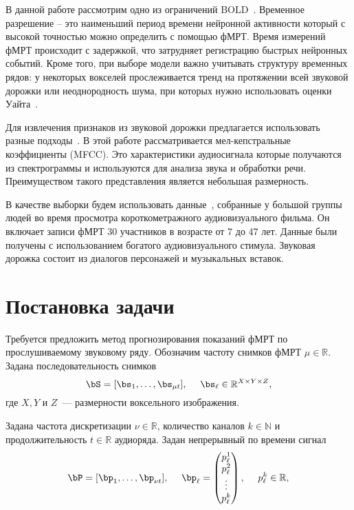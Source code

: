 \documentclass[12pt, twoside]{article}
\begin{document}
В данной работе рассмотрим одно из ограничений BOLD~\citep{menon1999spatial}. Временное разрешение -- это наименьший период времени нейронной активности который с высокой точностью можно определить с помощью фМРТ. Время измерений фМРТ происходит с задержкой, что затрудняет регистрацию быстрых нейронных событий. Кроме того, при выборе модели важно учитывать структуру временных рядов: у некоторых вокселей прослеживается тренд на протяжении всей звуковой дорожки или неоднородность шума, при которых нужно использовать оценки Уайта~\citep{hetero}.

Для извлечения признаков из звуковой дорожки предлагается использовать разные подходы~\citep{audiofeaturetrends}. В этой работе рассматривается мел-кепстральные коэффициенты (MFCC). Это характеристики аудиосигнала которые получаются из спектрограммы и используются для анализа звука и обработки речи. Преимуществом такого представления является небольшая размерность.

В качестве выборки будем использовать данные~\citep{Berezutskaya2022}, собранные у большой группы людей во время просмотра короткометражного аудиовизуального фильма. Он включает записи фМРТ 30 участников в возрасте от 7 до 47 лет. Данные были получены с использованием богатого аудиовизуального стимула. Звуковая дорожка состоит из диалогов персонажей и музыкальных вставок.


\section{Постановка задачи}
Требуется предложить метод прогнозирования показаний фМРТ по прослушиваемому звуковому ряду. 
Обозначим частоту снимков фМРТ $\mu \in \mathbb{R}$. Задана последовательность снимков
\begin{equation}
	\label{eq1}
	\bS = [\bs_1, \ldots, \bs_{\mu t}], \quad\
	\bs_{\ell} \in \mathbb{R}^{X \times Y \times Z},
\end{equation}
где $X, Y$ и $Z$~--- размерности воксельного изображения.

Задана частота дискретизации $\nu \in \mathbb{R}$, количество каналов $k \in \mathbb{N}$ и продолжительность $t \in \mathbb{R}$ аудиоряда.
Задан непрерывный по времени сигнал
\begin{equation}
	\label{eq2}
	\bP = [\bp_1, \ldots, \bp_{\nu t}], \quad\
	\bp_{\ell} = 
        \begin{pmatrix}
        p_\ell^1\\
        p_\ell^2 \\
        \vdots \\
        p_\ell^k\\
        \end{pmatrix}, \quad\
	p_{\ell}^k \in \mathbb{R},
\end{equation}
\end{document}
